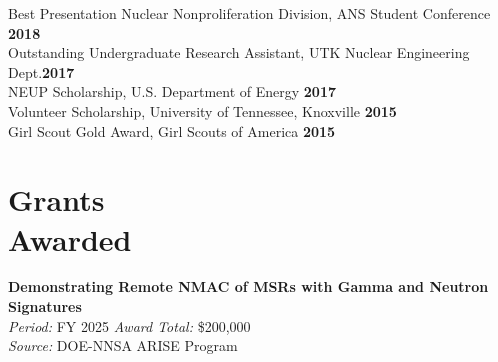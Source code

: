 \documentclass[margin,line]{resume}
\begin{document}
\begin{resume}
        Best Presentation Nuclear Nonproliferation Division, ANS Student Conference \hfill \textbf{2018}\vspace{0.5mm}\\%
        Outstanding Undergraduate Research Assistant, UTK Nuclear Engineering Dept.\hfill \textbf{2017}\vspace{.5mm}\\%
        NEUP Scholarship, U.S. Department of Energy \hfill \textbf{2017}\vspace{0.5mm}\\
        Volunteer Scholarship, University of Tennessee, Knoxville \hfill \textbf{2015}\vspace{0.5mm}\\
        Girl Scout Gold Award, Girl Scouts of America \hfill \textbf{2015}

    \section{\mysidestyle Grants\\Awarded}
    \textbf{Demonstrating Remote NMAC of MSRs with Gamma and Neutron Signatures} \\
    \textsl{Period:} FY 2025 \hfill \textsl{Award Total:} \$200,000\\
    \textsl{Source:} DOE-NNSA ARISE Program \hfill\\


\end{resume}
\end{document}
